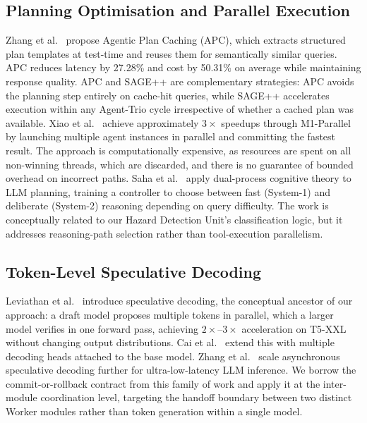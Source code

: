 \documentclass[conference]{IEEEtran}
\begin{document}
\subsection{Planning Optimisation and Parallel Execution}
Zhang et al.~\cite{zhang2025apc} propose Agentic Plan Caching (APC), which
extracts structured plan templates at test-time and reuses them for semantically
similar queries.
APC reduces latency by 27.28\% and cost by 50.31\% on average while maintaining
response quality.
APC and SAGE++ are complementary strategies: APC avoids the planning step
entirely on cache-hit queries, while SAGE++ accelerates execution within any
Agent-Trio cycle irrespective of whether a cached plan was available.
Xiao et al.~\cite{xiao2025m1parallel} achieve approximately $3\times$ speedups
through M1-Parallel by launching multiple agent instances in parallel and
committing the fastest result.
The approach is computationally expensive, as resources are spent on all
non-winning threads, which are discarded, and there is no guarantee of bounded
overhead on incorrect paths.
Saha et al.~\cite{saha2025system1x} apply dual-process cognitive theory to LLM
planning, training a controller to choose between fast (System-1) and deliberate
(System-2) reasoning depending on query difficulty.
The work is conceptually related to our Hazard Detection Unit's classification
logic, but it addresses reasoning-path selection rather than tool-execution
parallelism.

\subsection{Token-Level Speculative Decoding}
Leviathan et al.~\cite{leviathan2023speculative} introduce speculative decoding,
the conceptual ancestor of our approach: a draft model proposes multiple tokens
in parallel, which a larger model verifies in one forward pass, achieving
$2\times$--$3\times$ acceleration on T5-XXL without changing output distributions.
Cai et al.~\cite{cai2024medusa} extend this with multiple decoding heads attached
to the base model.
Zhang et al.~\cite{zhang2025swiftspec} scale asynchronous speculative decoding
further for ultra-low-latency LLM inference.
We borrow the commit-or-rollback contract from this family of work and apply it
at the inter-module coordination level, targeting the handoff boundary between
two distinct Worker modules rather than token generation within a single model.
\end{document}
